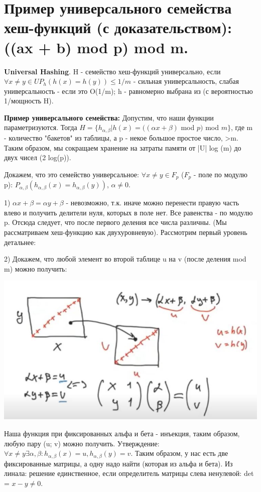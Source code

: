 \section{Пример универсального семейства хеш-функций (с доказательством): ((ax + b) mod p) mod m.}
\textbf{Universal Hashing}. H - семейство хеш-функций универсально, если $\forall x \neq y \in U P_h(h(x) = h(y)) \leqslant 1/m$ - сильная универсальность, слабая универсальность - если это {O}(1/m); h - равномерно выбрана из (с вероятностью 1/мощность H). \par
\textbf{Пример универсального семейства:} Допустим, что наши функции параметризуются. Тогда $H = \{ h_{\alpha, \beta}| h(x) = ((\alpha x + \beta)$ mod $p)$ mod $m\}$, где m - количество "бакетов" из таблицы, а p - некое большое простое число, >m. 
Таким образом, мы сокращаем хранение на затраты памяти от |U| log (m) до двух чисел (2 log(p)). \par
Докажем, что это семейство универсальное: $\forall x \neq y \in F_p$ ($F_p$ - поле по модулю p): $P_{\alpha, \beta}(h_{\alpha, \beta}(x) = h_{\alpha, \beta}(y))$, $\alpha \neq 0$. \par
1) $\alpha x + \beta = \alpha y + \beta$ - невозможно, т.к. иначе можно перенести правую часть влево и получить делители нуля, которых в поле нет. Все равенства - по модулю p. Отсюда следует, что после первого деления все числа различны. (Мы рассматриваем хеш-функцию как двухуровневую). Рассмотрим первый уровень детальнее: \par
2) Докажем, что любой элемент во второй таблице u на v (после деления mod m) можно получить: \par
\includegraphics{images/76-83_biection} \par
Наша функция при фиксированных альфа и бета - инъекция, таким образом, любую пару (u; v) можно получить. Утверждение: $\forall x \neq y \exists \alpha, \beta:  h_{\alpha, \beta}(x) = u,  h_{\alpha, \beta}(y) = v$. Таким образом, у нас есть две фиксированные матрицы, а одну надо найти (которая из альфа и бета). Из линала: решение единственное, если определитель матрицы слева ненулевой: det = $x - y \neq 0$. \par
